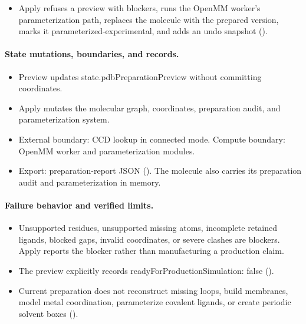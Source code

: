 \documentclass[11pt]{article}
\begin{document}
\begin{small}
\begin{itemize}[leftmargin=*]
\item Apply refuses a preview with blockers, runs the OpenMM worker's parameterization path, replaces the molecule with the prepared version, marks it parameterized-experimental, and adds an undo snapshot ().

\end{itemize}

\paragraph{State mutations, boundaries, and records.}

\begin{itemize}[leftmargin=*]

\item Preview updates state.pdbPreparationPreview without committing coordinates.

\item Apply mutates the molecular graph, coordinates, preparation audit, and parameterization system.

\item External boundary: CCD lookup in connected mode. Compute boundary: OpenMM worker and parameterization modules.

\item Export: preparation-report JSON (). The molecule also carries its preparation audit and parameterization in memory.

\end{itemize}

\paragraph{Failure behavior and verified limits.}

\begin{itemize}[leftmargin=*]

\item Unsupported residues, unsupported missing atoms, incomplete retained ligands, blocked gaps, invalid coordinates, or severe clashes are blockers. Apply reports the blocker rather than manufacturing a production claim.

\item The preview explicitly records readyForProductionSimulation: false ().

\item Current preparation does not reconstruct missing loops, build membranes, model metal coordination, parameterize covalent ligands, or create periodic solvent boxes ().


\end{itemize}
\end{small}
\end{document}
